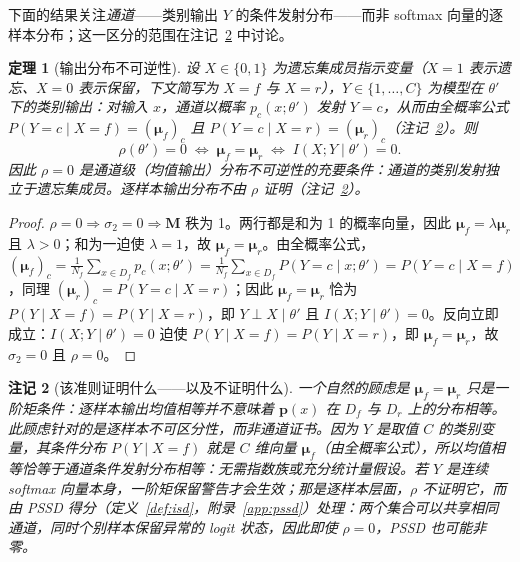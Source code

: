 \documentclass[11pt,a4paper]{article}
\newtheorem{theorem}{定理}[section]
\newtheorem{remark}[theorem]{注记}
\begin{document}
下面的结果关注\emph{通道}——类别输出 $Y$ 的条件发射分布——而非 softmax 向量的逐样本分布；这一区分的范围在注记~\ref{rem:channel} 中讨论。

\begin{theorem}[输出分布不可逆性]
\label{thm:perfect}
设 $X\in\{0,1\}$ 为遗忘集成员指示变量（$X{=}1$ 表示遗忘、$X{=}0$ 表示保留，下文简写为 $X{=}f$ 与 $X{=}r$），$Y\in\{1,\dots,C\}$ 为模型在 $\theta'$ 下的类别输出：对输入 $x$，通道以概率 $p_c(x;\theta')$ 发射 $Y{=}c$，从而由全概率公式 $P(Y{=}c\mid X{=}f)=(\boldsymbol{\mu}_f)_c$ 且 $P(Y{=}c\mid X{=}r)=(\boldsymbol{\mu}_r)_c$（注记~\ref{rem:channel}）。则
\begin{equation}
\rho(\theta') = 0 \;\Longleftrightarrow\; \boldsymbol{\mu}_f = \boldsymbol{\mu}_r \;\Longleftrightarrow\; I(X; Y \mid \theta') = 0.
\end{equation}
因此 $\rho=0$ 是\emph{通道级}（均值输出）分布不可逆性的充要条件：通道的类别发射独立于遗忘集成员。逐样本输出分布不由 $\rho$ 证明（注记~\ref{rem:channel}）。
\end{theorem}

\begin{proof}
$\rho=0 \Rightarrow \sigma_2=0 \Rightarrow \mathbf{M}$ 秩为 1。两行都是和为 1 的概率向量，因此 $\boldsymbol{\mu}_f = \lambda\boldsymbol{\mu}_r$ 且 $\lambda>0$；和为一迫使 $\lambda=1$，故 $\boldsymbol{\mu}_f=\boldsymbol{\mu}_r$。由全概率公式，$(\boldsymbol{\mu}_f)_c = \frac{1}{N_f}\sum_{x\in D_f}p_c(x;\theta') = \frac{1}{N_f}\sum_{x\in D_f}P(Y{=}c\mid x;\theta') = P(Y{=}c\mid X{=}f)$，同理 $(\boldsymbol{\mu}_r)_c = P(Y{=}c\mid X{=}r)$；因此 $\boldsymbol{\mu}_f=\boldsymbol{\mu}_r$ 恰为 $P(Y\mid X{=}f)=P(Y\mid X{=}r)$，即 $Y\perp X\mid\theta'$ 且 $I(X;Y\mid\theta')=0$。反向立即成立：$I(X;Y\mid\theta')=0$ 迫使 $P(Y\mid X{=}f)=P(Y\mid X{=}r)$，即 $\boldsymbol{\mu}_f=\boldsymbol{\mu}_r$，故 $\sigma_2=0$ 且 $\rho=0$。
\end{proof}

\begin{remark}[该准则证明什么——以及不证明什么]
\label{rem:channel}
一个自然的顾虑是 $\boldsymbol{\mu}_f=\boldsymbol{\mu}_r$ 只是一阶矩条件：逐样本输出\emph{均值}相等并不意味着 $\mathbf{p}(x)$ 在 $D_f$ 与 $D_r$ 上的\emph{分布}相等。此顾虑针对的是\emph{逐样本}不可区分性，而非\emph{通道}证书。因为 $Y$ 是取值 $C$ 的类别变量，其条件分布 $P(Y\mid X{=}f)$ \emph{就是} $C$ 维向量 $\boldsymbol{\mu}_f$（由全概率公式），所以均值相等恰等于通道条件发射分布相等：无需指数族或充分统计量假设。若 $Y$ 是连续 softmax 向量本身，一阶矩保留警告才会生效；那是逐样本层面，$\rho$ 不证明它，而由 PSSD 得分（定义~\ref{def:isd}，附录~\ref{app:pssd}）处理：两个集合可以共享相同通道，同时个别样本保留异常的 logit 状态，因此即使 $\rho=0$，PSSD 也可能非零。
\end{remark}
\end{document}
